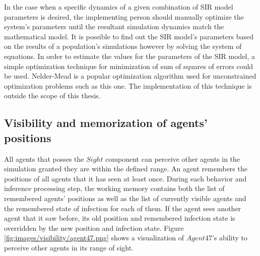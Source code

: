 In the case when a specific dynamics of a given combination of SIR model parameters is desired, the implementing person should manually optimize the system's parameters until the resultant simulation dynamics match the mathematical model.
It is possible to find out the SIR model's parameters based on the results of a population's simulations however by solving the system of equations.
In order to estimate the values for the parameters of the SIR model, a simple optimization technique for minimization of sum of squares of errors could be used.
Nelder-Mead is a popular optimization algorithm used for unconstrained optimization problems such as this one\cite{singer2009nelder}.
The implementation of this technique is outside the scope of this thesis.

\subsection{Visibility and memorization of agents' positions}

All agents that posses the $Sight$ component can perceive other agents in the simulation granted they are within the defined range.
An agent remembers the positions of all agents that it has seen at least once.
During each behavior and inference processing step, the working memory contains both the list of remembered agents' positions as well as the list of currently visible agents and the remembered state of infection for each of them.
If the agent sees another agent that it saw before, its old position and remembered infection state is overridden by the new position and infection state.
Figure \ref{fig:images/visibility/agent47.png} shows a visualization of $Agent47$'s ability to perceive other agents in its range of sight.

